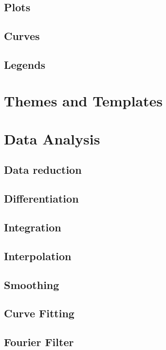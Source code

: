 \section{Plots}\label{sec:2d_plots}
\section{Curves}\label{sec:2d_curves}
\section{Legends}\label{sec:2d_legends}



\chapter{Themes and Templates}\label{ch:themes_templates}


\chapter{Data Analysis}\label{ch:data_analysis}
\section{Data reduction}\label{sec:data_reduction}
\section{Differentiation}\label{sec:differentiation}
\section{Integration}\label{sec:integration}
\section{Interpolation}\label{sec:interpolation}
\section{Smoothing}\label{sec:smoothing}
\section{Curve Fitting}\label{sec:curve_fitting}
\section{Fourier Filter}\label{sec:fourier_filter}

